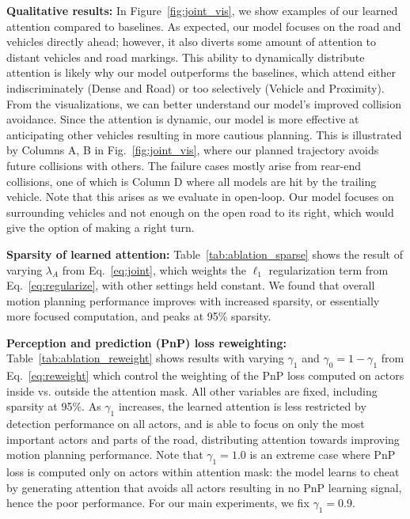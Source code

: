 \textbf{Qualitative results:}
In Figure~\ref{fig:joint_vis}, we show examples of our learned attention compared to baselines.
As expected, our model focuses on the road and vehicles directly ahead; however,
it also diverts some amount of attention to distant vehicles and road markings. This ability
to dynamically distribute attention is likely why our model outperforms the baselines,
which attend either indiscriminately (Dense and Road) or too selectively (Vehicle and Proximity). From the visualizations, we can better understand our model's improved collision avoidance. Since the attention is dynamic, our model is more effective at anticipating other vehicles resulting in more cautious planning. This is illustrated by Columns A, B in Fig.~\ref{fig:joint_vis}, where our planned trajectory avoids future collisions with others. 
The failure cases mostly arise from rear-end collisions, one of which is Column D where all models are hit by the trailing vehicle. Note that this arises as we evaluate in open-loop. Our model focuses on surrounding vehicles and not enough on the open road to its right, which would give the option of making a right turn.

\textbf{Sparsity of learned attention:} Table~\ref{tab:ablation_sparse} shows the result of varying $\lambda_A$ from Eq.~\ref{eq:joint}, which weights the $\ell_1$ regularization term from Eq.~\ref{eq:regularize}, with other settings held constant. We found that overall motion planning performance improves with increased sparsity, or essentially more focused computation, and peaks at 95\% sparsity. 



\textbf{Perception and prediction (PnP) loss reweighting:} Table~\ref{tab:ablation_reweight} shows results with varying $\gamma_1$ and $\gamma_0 = 1 - \gamma_1$ from Eq.~\ref{eq:reweight} which control the weighting of the PnP loss computed on actors inside vs. outside the attention mask. All other variables are fixed, including sparsity at 95\%. 
As $\gamma_1$ increases, the learned attention is less restricted by detection performance on all actors, and is able to focus on only the most important actors and parts of the road, distributing attention towards improving motion planning performance. Note that $\gamma_1=1.0$ is an extreme case where PnP loss is computed only on actors within attention mask: the model learns to cheat by generating attention that avoids all actors resulting in no PnP learning signal, hence the poor performance. For our main experiments, we fix $\gamma_1=0.9$.

